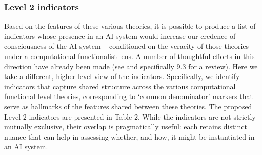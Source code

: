 \documentclass[11pt, a4paper, onecolumn, gdm]{google}
\begin{document}
\subsubsection*{Level 2 indicators}\label{level-2-indicators}

Based on the features of these various theories, it is possible to produce a list of indicators whose presence in an AI system would increase our credence of consciousness of the AI system -- conditioned on the veracity of those theories under a computational functionalist lens.
A number of thoughtful efforts in this direction have already been made (see  and specifically 9.3 for a review).
Here we take a different, higher-level view of the indicators.
Specifically, we identify indicators that capture shared structure across the various computational functional level theories, corresponding to `common denominator' markers that serve as hallmarks of the features shared between these theories.
The proposed Level 2 indicators are presented in Table 2.
While the indicators are not strictly mutually exclusive, their overlap is pragmatically useful: each retains distinct nuance that can help in assessing whether, and how, it might be instantiated in an AI system.
\end{document}
